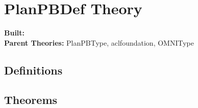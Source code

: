 \documentclass[11pt, twoside]{article}
\begin{document}
\HOLssmPlanPBTheorems

\section{PlanPBDef Theory}
\begin{flushleft}
\textbf{Built:} \HOLPlanPBDefDate \\[2pt]
\textbf{Parent Theories:} PlanPBType, aclfoundation, OMNIType
\end{flushleft}


\subsection{Definitions}

\HOLPlanPBDefDefinitions

\subsection{Theorems}

\HOLPlanPBDefTheorems

\HOLindex
\end{document}
